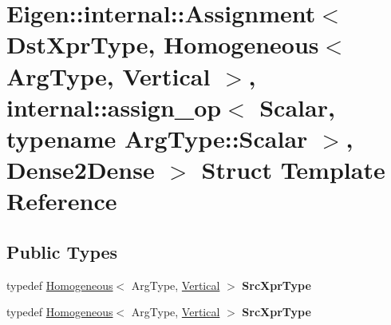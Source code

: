 \hypertarget{struct_eigen_1_1internal_1_1_assignment_3_01_dst_xpr_type_00_01_homogeneous_3_01_arg_type_00_01_0510af0d603205dcee3ee308c9bc1bc6}{}\section{Eigen\+:\+:internal\+:\+:Assignment$<$ Dst\+Xpr\+Type, Homogeneous$<$ Arg\+Type, Vertical $>$, internal\+:\+:assign\+\_\+op$<$ Scalar, typename Arg\+Type\+:\+:Scalar $>$, Dense2\+Dense $>$ Struct Template Reference}
\label{struct_eigen_1_1internal_1_1_assignment_3_01_dst_xpr_type_00_01_homogeneous_3_01_arg_type_00_01_0510af0d603205dcee3ee308c9bc1bc6}
\subsection*{Public Types}
\begin{DoxyCompactItemize}
\item 
\mbox{\label{struct_eigen_1_1internal_1_1_assignment_3_01_dst_xpr_type_00_01_homogeneous_3_01_arg_type_00_01_0510af0d603205dcee3ee308c9bc1bc6_a32ad4def77e7d9593c334eb3777447fc}} 
typedef \hyperlink{group___geometry___module_class_eigen_1_1_homogeneous}{Homogeneous}$<$ Arg\+Type, \hyperlink{group__enums_ggad49a7b3738e273eb00932271b36127f7addca718e0564723df21d61b94b1198be}{Vertical} $>$ {\bfseries Src\+Xpr\+Type}
\item 
\mbox{\label{struct_eigen_1_1internal_1_1_assignment_3_01_dst_xpr_type_00_01_homogeneous_3_01_arg_type_00_01_0510af0d603205dcee3ee308c9bc1bc6_a32ad4def77e7d9593c334eb3777447fc}} 
typedef \hyperlink{group___geometry___module_class_eigen_1_1_homogeneous}{Homogeneous}$<$ Arg\+Type, \hyperlink{group__enums_ggad49a7b3738e273eb00932271b36127f7addca718e0564723df21d61b94b1198be}{Vertical} $>$ {\bfseries Src\+Xpr\+Type}
\end{DoxyCompactItemize}
